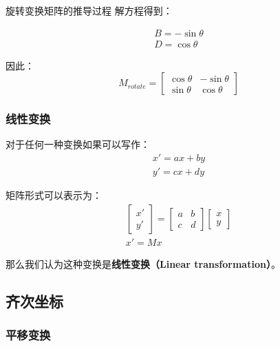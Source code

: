 \documentclass[openany]{progbookcn}
\begin{document}
\begin{titledbox}{旋转变换矩阵的推导过程}
解方程得到：

\begin{equation}
	\begin{split}
		B=-\sin\theta\\D=\cos\theta
	\end{split}
\end{equation}

因此：
\begin{equation}
	M_{rotate}=\begin{bmatrix}\cos\theta&-\sin\theta\\\sin\theta&\cos\theta\end{bmatrix}
\end{equation}

\end{titledbox}

\subsubsection{线性变换}

对于任何一种变换如果可以写作：
\begin{equation}
	\begin{split}
		x'=ax+by\\y'=cx+dy
	\end{split}
\end{equation}

矩阵形式可以表示为：
\begin{equation}
	\begin{split}
	\begin{bmatrix}x'\\y'\end{bmatrix}=\begin{bmatrix}a&b\\c&d\end{bmatrix}\begin{bmatrix}x\\y\end{bmatrix}
	\\
	x'=Mx
	\end{split}
\end{equation}

那么我们认为这种变换是\textbf{线性变换（Linear transformation）}。

\subsection{齐次坐标}

\subsubsection{平移变换}
\end{document}
